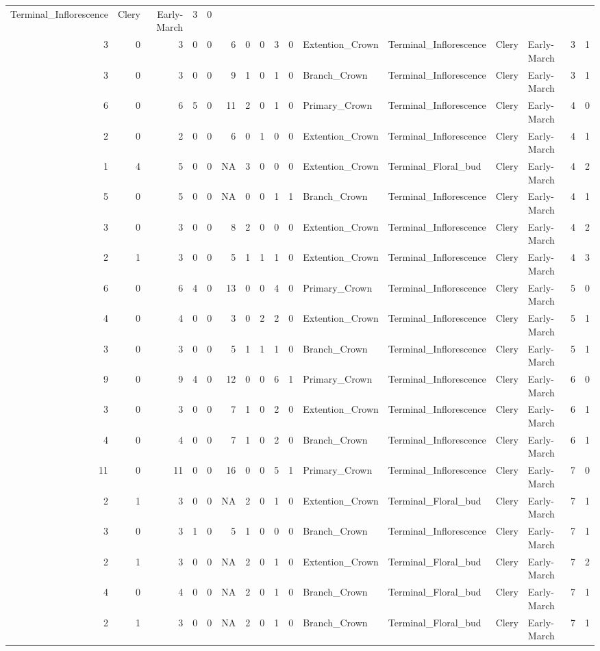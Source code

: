 \documentclass[]{article}
\begin{document}
\begin{longtable}[]{@{}rrrrrrrrrrllllrl@{}}
Terminal\_Inflorescence & Clery & Early-March & 3 & 0\tabularnewline
3 & 0 & 3 & 0 & 0 & 6 & 0 & 0 & 3 & 0 & Extention\_Crown &
Terminal\_Inflorescence & Clery & Early-March & 3 & 1\tabularnewline
3 & 0 & 3 & 0 & 0 & 9 & 1 & 0 & 1 & 0 & Branch\_Crown &
Terminal\_Inflorescence & Clery & Early-March & 3 & 1\tabularnewline
6 & 0 & 6 & 5 & 0 & 11 & 2 & 0 & 1 & 0 & Primary\_Crown &
Terminal\_Inflorescence & Clery & Early-March & 4 & 0\tabularnewline
2 & 0 & 2 & 0 & 0 & 6 & 0 & 1 & 0 & 0 & Extention\_Crown &
Terminal\_Inflorescence & Clery & Early-March & 4 & 1\tabularnewline
1 & 4 & 5 & 0 & 0 & NA & 3 & 0 & 0 & 0 & Extention\_Crown &
Terminal\_Floral\_bud & Clery & Early-March & 4 & 2\tabularnewline
5 & 0 & 5 & 0 & 0 & NA & 0 & 0 & 1 & 1 & Branch\_Crown &
Terminal\_Inflorescence & Clery & Early-March & 4 & 1\tabularnewline
3 & 0 & 3 & 0 & 0 & 8 & 2 & 0 & 0 & 0 & Extention\_Crown &
Terminal\_Inflorescence & Clery & Early-March & 4 & 2\tabularnewline
2 & 1 & 3 & 0 & 0 & 5 & 1 & 1 & 1 & 0 & Extention\_Crown &
Terminal\_Inflorescence & Clery & Early-March & 4 & 3\tabularnewline
6 & 0 & 6 & 4 & 0 & 13 & 0 & 0 & 4 & 0 & Primary\_Crown &
Terminal\_Inflorescence & Clery & Early-March & 5 & 0\tabularnewline
4 & 0 & 4 & 0 & 0 & 3 & 0 & 2 & 2 & 0 & Extention\_Crown &
Terminal\_Inflorescence & Clery & Early-March & 5 & 1\tabularnewline
3 & 0 & 3 & 0 & 0 & 5 & 1 & 1 & 1 & 0 & Branch\_Crown &
Terminal\_Inflorescence & Clery & Early-March & 5 & 1\tabularnewline
9 & 0 & 9 & 4 & 0 & 12 & 0 & 0 & 6 & 1 & Primary\_Crown &
Terminal\_Inflorescence & Clery & Early-March & 6 & 0\tabularnewline
3 & 0 & 3 & 0 & 0 & 7 & 1 & 0 & 2 & 0 & Extention\_Crown &
Terminal\_Inflorescence & Clery & Early-March & 6 & 1\tabularnewline
4 & 0 & 4 & 0 & 0 & 7 & 1 & 0 & 2 & 0 & Branch\_Crown &
Terminal\_Inflorescence & Clery & Early-March & 6 & 1\tabularnewline
11 & 0 & 11 & 0 & 0 & 16 & 0 & 0 & 5 & 1 & Primary\_Crown &
Terminal\_Inflorescence & Clery & Early-March & 7 & 0\tabularnewline
2 & 1 & 3 & 0 & 0 & NA & 2 & 0 & 1 & 0 & Extention\_Crown &
Terminal\_Floral\_bud & Clery & Early-March & 7 & 1\tabularnewline
3 & 0 & 3 & 1 & 0 & 5 & 1 & 0 & 0 & 0 & Branch\_Crown &
Terminal\_Inflorescence & Clery & Early-March & 7 & 1\tabularnewline
2 & 1 & 3 & 0 & 0 & NA & 2 & 0 & 1 & 0 & Extention\_Crown &
Terminal\_Floral\_bud & Clery & Early-March & 7 & 2\tabularnewline
4 & 0 & 4 & 0 & 0 & NA & 2 & 0 & 1 & 0 & Branch\_Crown &
Terminal\_Floral\_bud & Clery & Early-March & 7 & 1\tabularnewline
2 & 1 & 3 & 0 & 0 & NA & 2 & 0 & 1 & 0 & Branch\_Crown &
Terminal\_Floral\_bud & Clery & Early-March & 7 & 1\tabularnewline

\end{longtable}
\end{document}
